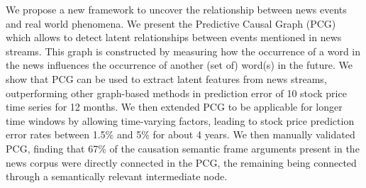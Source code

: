 We propose a new framework to uncover the relationship between news events and real world phenomena. We present the Predictive Causal Graph (PCG) which allows to detect latent relationships between events mentioned in news streams. This graph is constructed by measuring how the occurrence of a word in the news influences the occurrence of another (set of) word(s) in the future. We show that PCG can be used to extract latent features from news streams, outperforming other graph-based methods in prediction error of 10 stock price time series for 12 months. We then extended PCG to be applicable for longer time windows by allowing time-varying factors, leading to stock price prediction error rates between 1.5\% and 5\% for about 4 years. We then manually validated PCG, finding that 67\% of the causation semantic frame arguments present in the news corpus were directly connected in the PCG, the remaining being connected through a semantically relevant intermediate node.